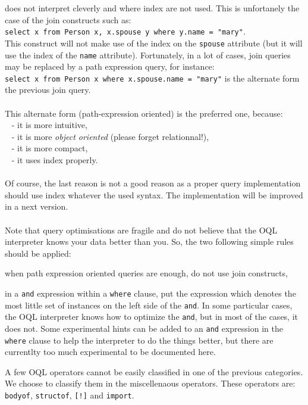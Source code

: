 does not interpret cleverly and where index are not used.
This is unfortanely the case of the join constructs such as:\\
\texttt{select x from Person x, x.spouse y where y.name = "mary"}.\\
This construct will not make use of the index on the \texttt{spouse} attribute
(but it will use the index of the \texttt{name} attribute).
Fortunately, in a lot of cases, join queries may be replaced by a path expression query, for
instance:\\
\texttt{select x from Person x where x.spouse.name = "mary"} is the
alternate form the previous join query.\\\\
This alternate form (path-expression oriented) is the preferred one, because:\\
\mbox{ } - it is more intuitive,\\
\mbox{ } - it is more \emph{object oriented} (please forget relationnal!),\\
\mbox{ } - it is more compact,\\
\mbox{ } - it uses index properly.\\\\
Of course, the last reason is not a good reason as a proper query
implementation should use index whatever the used syntax.
The implementation will be improved in a next version.
\\
\\
Note that query optimisations are fragile and do not believe that
the OQL interpreter knows your data better than you. So, the two following
simple rules should be applied:
\be
\item when path expression oriented queries are enough, do not use
join constructs,
\item in a \texttt{and} expression within a \texttt{where} clause, put
the expression which denotes the most little set of instances on
the left side of the \texttt{and}. In some particular cases, the
OQL interpreter knows how to optimize the \texttt{and}, but in
most of the cases, it does not.
\ee
Some experimental hints can be added to an \texttt{and} expression
in the \texttt{where} clause to help the interpreter to do the
things better, but there are currentlty too much experimental to
be documented here.

A few OQL operators cannot be easily classified in one of the previous
categories. We choose to classify them in the miscellenaous operators.
These operators are: \texttt{bodyof}, \texttt{structof}, \texttt{[!]} and
\texttt{import}.

